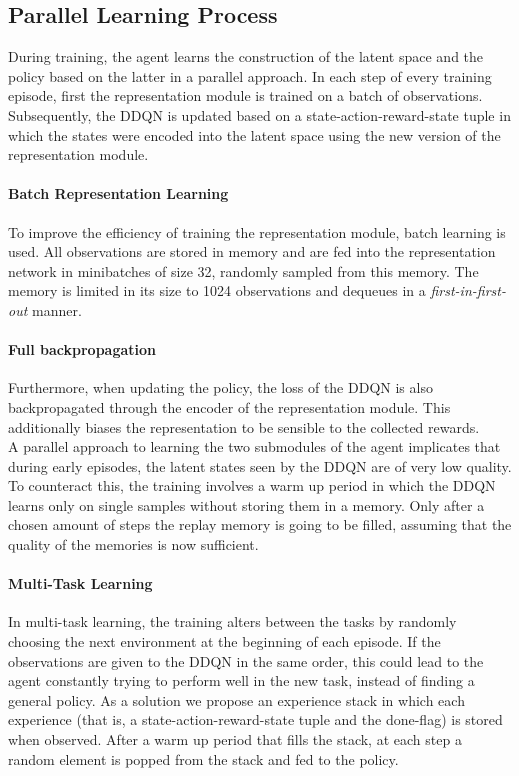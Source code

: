 \subsection{Parallel Learning Process}
During training, the agent learns the construction of the latent space and the policy based on the latter in a parallel approach. In each step of every training episode, first the representation module is trained on a batch of observations. Subsequently, the DDQN is updated based on a state-action-reward-state tuple in which the states were encoded into the latent space using the new version of the representation module. 

\paragraph{Batch Representation Learning} To improve the efficiency of training the representation module, batch learning is used. All observations are stored in memory and are fed into the representation network in minibatches of size 32, randomly sampled from this memory. The memory is limited in its size to 1024 observations and dequeues in a \textit{first-in-first-out} manner.

\paragraph{Full backpropagation} Furthermore, when updating the policy, the loss of the DDQN is also backpropagated through the encoder of the representation module. This additionally biases the representation to be sensible to the collected rewards.\\

A parallel approach to learning the two submodules of the agent implicates that during early episodes, the latent states seen by the DDQN are of very low quality. To counteract this, the training involves a warm up period in which the DDQN learns only on single samples without storing them in a memory. Only after a chosen amount of steps the replay memory is going to be filled, assuming that the quality of the memories is now sufficient.

\paragraph{Multi-Task Learning} In multi-task learning, the training alters between the tasks by randomly choosing the next environment at the beginning of each episode. If the observations are given to the DDQN in the same order, this could lead to the agent constantly trying to perform well in the new task, instead of finding a general policy. As a solution we propose an experience stack in which each experience (that is, a state-action-reward-state tuple and the done-flag) is stored when observed. After a warm up period that fills the stack, at each step a random element is popped from the stack and fed to the policy.

